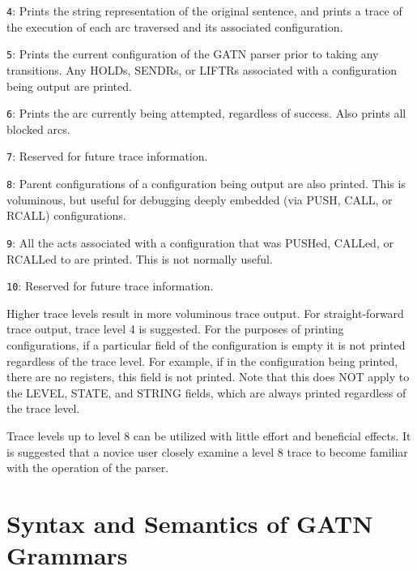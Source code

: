 \documentclass{book}
\begin{document}
\begin{description}
\begin{description}
\item{\verb|4|:} Prints the string representation of the original sentence, and prints a trace of the
execution of each arc traversed and its associated configuration.

\item{\verb|5|:} Prints the current configuration of the GATN parser prior to taking any transitions.
Any HOLDs, SENDRs, or LIFTRs associated with a configuration being output are printed.

\item{\verb|6|:} Prints the arc currently being attempted, regardless of success. Also prints all blocked
arcs.

\item{\verb|7|:} Reserved for future trace information.

\item{\verb|8|:} Parent configurations of a configuration being output are also printed. This is voluminous,
but useful for debugging deeply embedded (via PUSH, CALL, or RCALL) configurations.

\item{\verb|9|:} All the acts associated with a configuration that was PUSHed, CALLed, or RCALLed to
are printed. This is not normally useful.

\item{\verb|10|:} Reserved for future trace information.

\end{description} Higher trace levels result in more voluminous trace output.  For straight-forward trace
output, trace level 4 is suggested.  For the purposes of printing configurations, if a particular field of
the configuration is empty it is not printed regardless of the trace level.  For example, if in the
configuration being printed, there are no registers, this field is not printed.  Note that this does NOT apply
to the LEVEL, STATE, and STRING fields, which are always printed regardless of the trace level.

Trace levels up to level 8 can be utilized with little effort and beneficial effects.  It is suggested that a
novice user closely examine a level 8 trace to become familiar with the operation of the parser.

\end{description}

\section{Syntax and Semantics of GATN Grammars} \label{gramsyntax-section}
\end{document}
